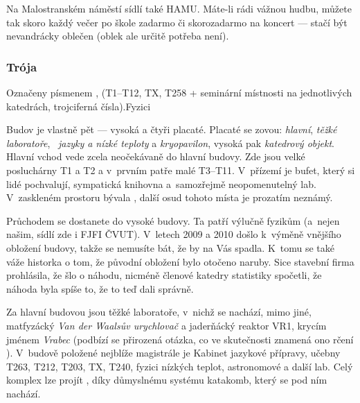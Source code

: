 Na Malostranském náměstí sídlí také HAMU. Máte-li rádi vážnou hudbu, můžete tak skoro každý večer po škole zadarmo či skorozadarmo na koncert --- stačí být nevandrácky oblečen (oblek ale určitě potřeba není).

\subsubsection{Trója}
 {Označeny písmenem ,
(T1--T12, TX, T258 + seminární místnosti na jednotlivých
katedrách,  trojciferná čísla).}{Fyzici}

Budov je vlastně pět ---  vysoká a čtyři placaté. Placaté se zovou:
\emph{hlavní}, \emph{těžké laboratoře\/}, ~\emph{jazyky a nízké
teploty} a \emph{kryopavilon}, vysoká pak \emph{katedrový objekt}.
Hlavní vchod vede zcela neočekávaně do hlavní budovy. Zde jsou
velké posluchárny T1 a T2 a v~prvním patře malé T3--T11. V~přízemí
je bufet, který si lidé pochvalují, sympatická knihovna
a~samozřejmě neopomenutelný lab. V~zaskleném prostoru bývala
\SKP, další osud tohoto místa je prozatím neznámý. 

Průchodem se
dostanete do vysoké budovy. Ta patří výlučně fyzikům (a~nejen
našim, sídlí zde i FJFI ČVUT). V~letech 2009 a 2010 došlo k~výměně
vnějšího obložení budovy, takže se nemusíte bát, že by na Vás
spadla. K~tomu se také váže historka o tom, že původní obložení bylo otočeno naruby. Sice stavební firma prohlásila, že šlo o náhodu, nicméně členové katedry statistiky spočetli, že náhoda byla spíše to, že to teď dali správně.

Za hlavní budovou jsou těžké laboratoře, v~nichž se nachází, mimo
jiné, matfyzácký {\it Van der Waalsův urychlovač\/} a jaderňácký
reaktor VR1, krycím jménem {\it Vrabec\/} (podbízí se přirozená
otázka, co ve skutečnosti znamená ono rčení ). V~budově položené nejblíže magistrále je Kabinet
jazykové přípravy, učebny T263, T212, T203, TX, T240, fyzici
nízkých teplot, astronomové a další lab.  Celý komplex lze projít
, díky důmyslnému systému katakomb, který se pod
ním nachází.
